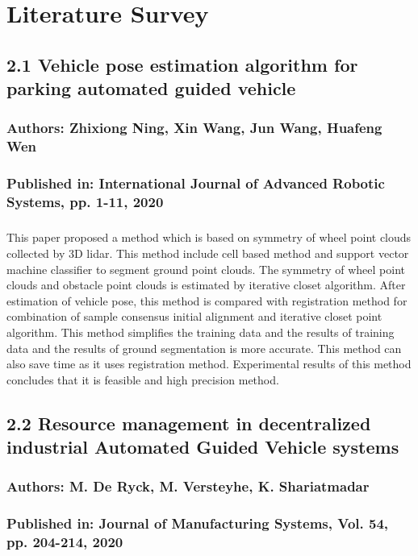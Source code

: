 \chapter{Literature Survey}

\section*{2.1 Vehicle pose estimation algorithm for parking automated guided vehicle\cite{ZNing}}
\subsection*{Authors: Zhixiong Ning, Xin Wang, Jun Wang, Huafeng Wen}
\subsection*{Published in: International Journal of Advanced Robotic Systems, pp. 1-11, 2020}
\paragraph{}This paper proposed a method which is based on symmetry of wheel point clouds collected by 3D lidar. This method include cell based method and support vector machine classifier to segment ground point clouds. The symmetry of wheel point clouds and obstacle point clouds is estimated by iterative closet algorithm. After estimation of vehicle pose, this method is compared with registration method for combination of sample consensus initial alignment and iterative closet point algorithm. This method simplifies the training data and the results of training data and the results of ground segmentation is more accurate. This method can also save time as it uses registration method. Experimental results of this method concludes that it is feasible and high precision method.
\newpage
\section*{2.2 Resource management in decentralized industrial Automated Guided Vehicle systems\cite{KShariatmadar}}
\subsection*{Authors: M. De Ryck, M. Versteyhe, K. Shariatmadar}
\subsection*{Published in: Journal of Manufacturing Systems, Vol. 54, pp. 204-214, 2020}
